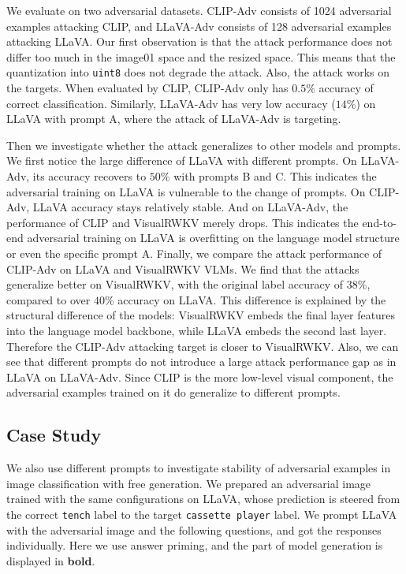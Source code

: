 \documentclass{article}
\begin{document}
We evaluate on two adversarial datasets. CLIP-Adv consists of 1024 adversarial examples attacking CLIP, and LLaVA-Adv consists of 128 adversarial examples attacking LLaVA. Our first observation is that the attack performance does not differ too much in the image01 space and the resized space. This means that the quantization into \texttt{uint8} does not degrade the attack. Also, the attack works on the targets. When evaluated by CLIP, CLIP-Adv only has $0.5\%$ accuracy of correct classification. Similarly, LLaVA-Adv has very low accuracy ($14\%$) on LLaVA with prompt A, where the attack of LLaVA-Adv is targeting.

Then we investigate whether the attack generalizes to other models and prompts.
We first notice the large difference of LLaVA with different prompts. On LLaVA-Adv, its accuracy recovers to $50\%$ with prompts B and C. This indicates the adversarial training on LLaVA is vulnerable to the change of prompts.
On CLIP-Adv, LLaVA accuracy stays relatively stable. And on LLaVA-Adv, the performance of CLIP and VisualRWKV merely drops.
This indicates the end-to-end adversarial training on LLaVA is overfitting on the language model structure or even the specific prompt A.
Finally, we compare the attack performance of CLIP-Adv on LLaVA and VisualRWKV VLMs. We find that the attacks generalize better on VisualRWKV, with the original label accuracy of $38\%$, compared to over $40\%$ accuracy on LLaVA. This difference is explained by the structural difference of the models: VisualRWKV embeds the final layer features into the language model backbone, while LLaVA embeds the second last layer. Therefore the CLIP-Adv attacking target is closer to VisualRWKV. Also, we can see that different prompts do not introduce a large attack performance gap as in LLaVA on LLaVA-Adv. Since CLIP is the more low-level visual component, the adversarial examples trained on it do generalize to different prompts.

\subsection{Case Study}

We also use different prompts to investigate stability of adversarial examples in image classification with free generation. 
We prepared an adversarial image trained with the same configurations on LLaVA, whose prediction is steered from the correct \texttt{tench} label to the target \texttt{cassette player} label. We prompt LLaVA with the adversarial image and the following questions, and got the responses individually. Here we use answer priming, and the part of model generation is displayed in \textbf{bold}.
\end{document}
